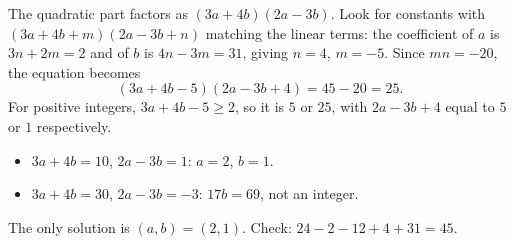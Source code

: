 The quadratic part factors as $(3a+4b)(2a-3b)$. Look for constants with $(3a+4b+m)(2a-3b+n)$ matching the linear terms: the coefficient of $a$ is $3n+2m=2$ and of $b$ is $4n-3m=31$, giving $n=4$, $m=-5$. Since $mn=-20$, the equation becomes
\[
(3a+4b-5)(2a-3b+4)=45-20=25 .
\]
For positive integers, $3a+4b-5\ge2$, so it is $5$ or $25$, with $2a-3b+4$ equal to $5$ or $1$ respectively.
\begin{itemize}
\item $3a+4b=10$, $2a-3b=1$: $a=2$, $b=1$.
\item $3a+4b=30$, $2a-3b=-3$: $17b=69$, not an integer.
\end{itemize}
The only solution is $\boxed{(a,b)=(2,1)}$. Check: $24-2-12+4+31=45$.

